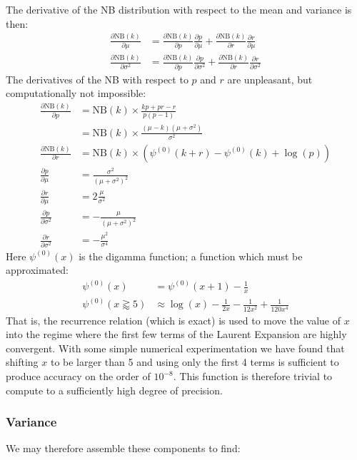 \documentclass[fleqn,usenatbib]{acmart}
\newcommand{\pdiv}[2]{\frac{\partial #1}{\partial #2}}
\begin{document}
			The derivative of the NB distribution with respect to the mean and variance is then:
			\begin{align*}
				\pdiv{\text{NB}(k)}{\mu} & = \pdiv{\text{NB}(k)}{p}\pdiv{p}{\mu}  +\pdiv{\text{NB}(k)}{r}\pdiv{r}{\mu} 
				\\
				\pdiv{\text{NB}(k)}{\sigma^2} & = \pdiv{\text{NB}(k)}{p}\pdiv{p}{\sigma^2}  +\pdiv{\text{NB}(k)}{r}\pdiv{r}{\sigma^2} 
			\end{align*}
			The derivatives of the NB with respect to $p$ and $r$ are unpleasant, but computationally not impossible:
			\def\dig{\psi^{(0)}}
			\begin{align*}
				\pdiv{\text{NB}(k)}{p} & = \text{NB}(k) \times \frac{kp + pr - r}{p(p-1)}
				\\
					& =  \text{NB}(k) \times \frac{(\mu - k)(\mu + \sigma^2)}{\sigma^2}
				\\
				\pdiv{\text{NB}(k)}{r} & = \text{NB}(k) \times \left( \dig(k+r) - \dig(k) + \log(p) \right)
				\\
				\pdiv{p}{\mu} & = \frac{\sigma^2}{(\mu + \sigma^2)^2}
				\\
				\pdiv{r}{\mu} & = 2\frac{\mu}{\sigma^2}
				\\
				\pdiv{p}{\sigma^2} & = - \frac{\mu}{(\mu + \sigma^2)^2}
				\\
				\pdiv{r}{\sigma^2} & = -\frac{\mu^2}{\sigma^4}
			\end{align*}
			Here $\dig(x)$ is the digamma function; a function which must be approximated:
			\begin{align*}
				\dig(x) & = \dig(x+1) - \frac{1}{x}
				\\
				\dig\left( x \gtrapprox 5\right) & \approx \log(x) - \frac{1}{2x} - \frac{1}{12x^2} + \frac{1}{120 x^4} 
			\end{align*}
			That is, the recurrence relation (which is exact) is used to move the value of $x$ into the regime where the first few terms of the Laurent Expansion are highly convergent. With some simple numerical experimentation we have found that shifting $x$ to be larger than 5 and using only the first 4 terms is sufficient to produce accuracy on the order of $10^{-8}$. This function is therefore trivial to compute to a sufficiently high degree of precision.

			\subsubsection{Variance}

				We may therefore assemble these components to find:
\end{document}
